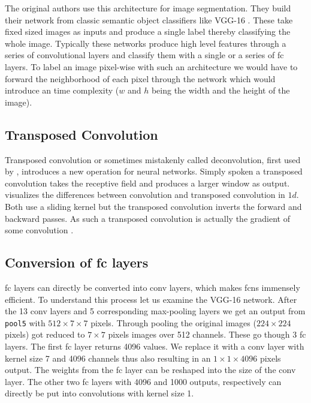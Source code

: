The original authors use this architecture for image segmentation. They build their network from classic semantic object classifiers like VGG-16 \citep{simonyan_very_2014}. These take fixed sized images as inputs and produce a single label thereby classifying the whole image. Typically these networks produce high level features through a series of convolutional layers and classify them with a single or a series of \gls{fc} layers. To label an image pixel-wise with such an architecture we would have to forward the neighborhood of each pixel through the network which would introduce an  time complexity ($w$ and $h$ being the width and the height of the image).

\subsection{Transposed Convolution} %
\label{sub:conepts:fcn:deconv}

Transposed convolution or sometimes mistakenly called deconvolution, first used by \citet{zeiler_deconvolutional_2010}, introduces a new operation for neural networks. Simply spoken a transposed convolution takes the receptive field and produces a larger window as output.  visualizes the differences between convolution and transposed convolution in $1d$. Both use a sliding kernel but the transposed convolution inverts the forward and backward passes. As such a transposed convolution is actually the gradient of some convolution \citep{dumoulin_guide_2016}.
\clearpage
\subsection{Conversion of \gls{fc} layers}
\label{sub:concepts:fcn:fc_conversion}
\gls{fc} layers can directly be converted into \gls{conv} layers, which makes \glspl{fcn} immensely efficient. To understand this process let us examine the VGG-16 network. After the 13 \gls{conv} layers and 5  corresponding max-pooling layers we get an output from \texttt{pool5} with $512\times7\times7$ pixels. Through pooling the original images ($224\times224$ pixels) got reduced to $7\times7$ pixels images over 512 channels. These go though 3 \gls{fc} layers. The first \gls{fc} layer returns 4096 values. We replace it with a \gls{conv} layer with kernel size 7 and 4096 channels thus also resulting in an $1\times1\times4096$ pixels output. The weights from the \gls{fc} layer can be reshaped into the size of the \gls{conv} layer. The other two \gls{fc} layers with 4096 and 1000 outputs, respectively can directly be put into convolutions with kernel size 1.

